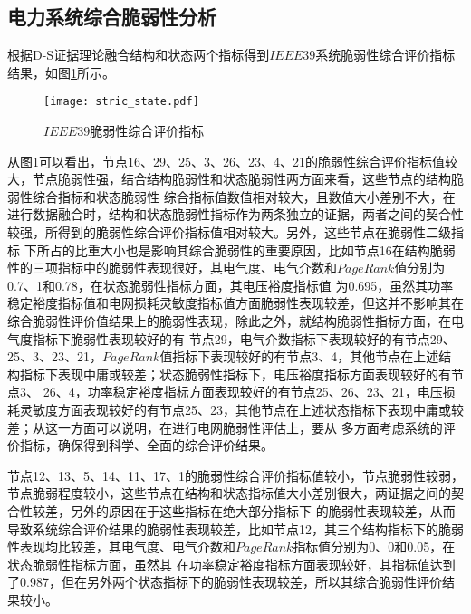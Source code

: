 \subsection{电力系统综合脆弱性分析}
\label{sec:singleAnalysis}
根据D-S证据理论融合结构和状态两个指标得到$IEEE39$系统脆弱性综合评价指标结果，如图\ref{fig:stric_state}所示。
\begin{figure}[H] %
  \centering
  \texttt{[image: stric\_state.pdf]}
  \caption{$IEEE39$脆弱性综合评价指标}
  \label{fig:stric_state}
\end{figure}

从图\ref{fig:stric_state}可以看出，节点16、29、25、3、26、23、4、21的脆弱性综合评价指标值较大，节点脆弱性强，结合结构脆弱性和状态脆弱性两方面来看，这些节点的结构脆弱性综合指标和状态脆弱性
综合指标值数值相对较大，且数值大小差别不大，在进行数据融合时，结构和状态脆弱性指标作为两条独立的证据，两者之间的契合性较强，所得到的脆弱性综合评价指标值相对较大。另外，这些节点在脆弱性二级指标
下所占的比重大小也是影响其综合脆弱性的重要原因，比如节点16在结构脆弱性的三项指标中的脆弱性表现很好，其电气度、电气介数和$PageRank$值分别为0.7、1和0.78，在状态脆弱性指标方面，其电压裕度指标值
为0.695，虽然其功率稳定裕度指标值和电网损耗灵敏度指标值方面脆弱性表现较差，但这并不影响其在综合脆弱性评价值结果上的脆弱性表现，除此之外，就结构脆弱性指标方面，在电气度指标下脆弱性表现较好的有
节点29，电气介数指标下表现较好的有节点29、25、3、23、21，$PageRank$值指标下表现较好的有节点3、4，其他节点在上述结构指标下表现中庸或较差；状态脆弱性指标下，电压裕度指标方面表现较好的有节点3、
26、4，功率稳定裕度指标方面表现较好的有节点25、26、23、21，电压损耗灵敏度方面表现较好的有节点25、23，其他节点在上述状态指标下表现中庸或较差；从这一方面可以说明，在进行电网脆弱性评估上，要从
多方面考虑系统的评价指标，确保得到科学、全面的综合评价结果。

节点12、13、5、14、11、17、1的脆弱性综合评价指标值较小，节点脆弱性较弱，节点脆弱程度较小，这些节点在结构和状态指标值大小差别很大，两证据之间的契合性较差，另外的原因在于这些指标在绝大部分指标下
的脆弱性表现较差，从而导致系统综合评价结果的脆弱性表现较差，比如节点12，其三个结构指标下的脆弱性表现均比较差，其电气度、电气介数和$PageRank$指标值分别为0、0和0.05，在状态脆弱性指标方面，虽然其
在功率稳定裕度指标方面表现较好，其指标值达到了0.987，但在另外两个状态指标下的脆弱性表现较差，所以其综合脆弱性评价结果较小。






